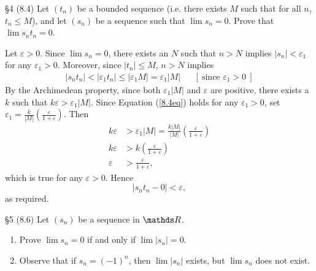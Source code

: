 \documentclass{homework}
\begin{document}
\begin{problem}{\S 4}
  (8.4) Let $(t_n)$ be a bounded sequence (i.e. there exists $M$ such that for all $n$, $t_n\le M$),
  and let $(s_n)$ be a sequence such that $\lim{s_n}=0$. Prove that $\lim{s_nt_n}=0$.
\end{problem}
\begin{solution}
  Let $\varepsilon>0$. Since $\lim{s_n}=0$, there exists an $N$ such that $n>N$ implies $\left| s_n
  \right| <\varepsilon_1$ for any $\varepsilon_1>0$. Moreover, since $\left| t_n \right| \le M$,
  $n>N$ implies
  \begin{align}
    \left| s_nt_n \right| < \left| \varepsilon_1t_n \right| \le \left| \varepsilon_1M \right|
    =\varepsilon_1\left| M \right| && [~\text{since $\varepsilon_1>0$}~] \label{8.4eq}
  \end{align}
  By the Archimedean property, since both $ \varepsilon_1\left| M \right| $ and $ \varepsilon$ are
  positive, there exists a $k$ such that $k\varepsilon>\varepsilon_1\left| M \right| $. Since
  Equation (\ref{8.4eq}) holds for any $\varepsilon_1>0$, set $\varepsilon_1=\frac{k}{\left| M
  \right| }\left( \frac{\varepsilon}{1+\varepsilon}\right) $. Then
  \begin{align*}
    k\varepsilon&>\varepsilon_1\left| M \right| = \frac{k\left| M \right| }{\left| M \right| }\left(
  \frac{\varepsilon}{1+\varepsilon}\right) \\
      k\varepsilon &>k\left( \frac{\varepsilon}{1+\varepsilon} \right) \\
      \varepsilon&>\frac{\varepsilon}{1+\varepsilon}
  ,\end{align*} which is true for any $\varepsilon>0$. Hence \[
    \left| s_nt_n-0 \right| <\varepsilon
  ,\] as required.
\end{solution}

\begin{problem}{\S 5}
  (8.6) Let $(s_n)$ be a sequence in $ \R$.
  \begin{enumerate}[label=(\alph*)]
    \item Prove $\lim{s_n}=0$ if and only if $\lim{\left| s_n \right| }=0$.
    \item Observe that if $s_n=(-1)^{n}$, then $\lim{\left| s_n \right| }$ exists, but $\lim{s_n}$
      does not exist.
  \end{enumerate}
\end{problem}
\end{document}
